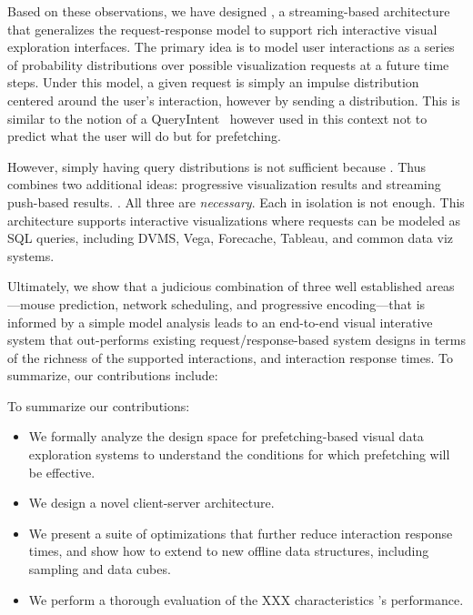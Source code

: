Based on these observations, we have designed \sys, a streaming-based architecture that generalizes the request-response model to support rich interactive visual exploration interfaces.  The primary idea is to model user interactions as a series of probability distributions over possible visualization requests at a future time steps.  Under this model, a given request is simply an impulse distribution centered around the user's interaction, however by sending a distribution.  This is similar to the notion of a QueryIntent~\cite{ebenstein2016fluxquery} however used in this context not to predict what the user will do but for prefetching.

However, simply having query distributions is not sufficient because .  Thus \sys combines two additional ideas: progressive visualization results and streaming push-based results. .  All three are {\it necessary}.  Each in isolation is not enough.   This architecture supports interactive visualizations where requests can be modeled as SQL queries, including DVMS, Vega, Forecache, Tableau, and common data viz systems.  



Ultimately, we show that a judicious combination of three well established areas---mouse prediction, network scheduling, and progressive encoding---that is informed by a simple model analysis leads to an end-to-end visual interative system that out-performs existing request/response-based system designs in terms of the richness of the supported interactions, and interaction response times.  To summarize, our contributions include:



To summarize our contributions:

\begin{itemize}[leftmargin=*, topsep=0mm, itemsep=0mm]

\item We formally analyze the design space for prefetching-based visual data exploration systems to understand the conditions for which prefetching will be effective.

\item We design a novel client-server architecture.

\item We present a suite of optimizations that further reduce interaction response times, and show how to extend to new offline data structures, including sampling and data cubes.

\item We perform a thorough evaluation of the XXX characteristics \sys's performance.  

\end{itemize}
